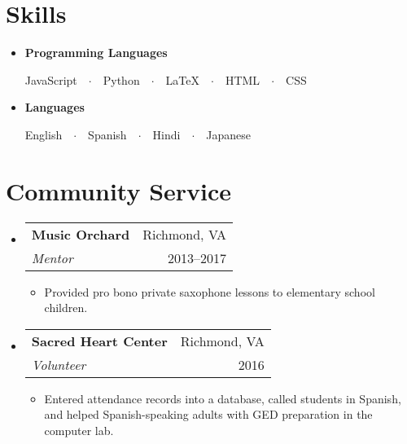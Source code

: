 \documentclass{article}
\makeatletter
\newcommand{\resumeSubHeadingListStart}{\begin{itemize}[leftmargin=*]}
\newcommand{\resumeSubHeadingListEnd}{\end{itemize}}
\newcommand{\workSubheading}[5]{
\item
\begin{tabular*}{\textwidth}{l@{\extracolsep{\fill}}r}
\textbf{\large#1} & {\small #2} \\
\textit{#3} & {#4}
\end{tabular*}
\vspace{-1em}
\begin{itemize}
\item #5
\end{itemize}
\vspace{0.25em}}
\newlength{\spacebox}
\newcommand{\skillEntry}[2]{
\item
\hspace{1em}\parbox{\spacebox}{
\raggedright{\textbf{#1}}}
\hspace{-2.5em} #2 \par}
\makeatother
\begin{document}

\vspace{-1em}
\section{Skills}

\resumeSubHeadingListStart
\skillEntry{Programming Languages}
{JavaScript\ \ $\cdotp$\ \ Python\ \ $\cdotp$\ \ \LaTeX\ \ $\cdotp$\ \ HTML\ \ $\cdotp$\ \ CSS}


\skillEntry{Languages}
{English\ \ $\cdotp$\ \ Spanish\ \ $\cdotp$\ \ Hindi\ \ $\cdotp$\ \ Japanese}
\resumeSubHeadingListEnd



\vspace{-1em}
\section{Community Service}

\resumeSubHeadingListStart
\workSubheading{Music Orchard}{Richmond, VA}
{Mentor}{2013--2017}
{Provided pro bono private saxophone lessons to elementary school children.}

\workSubheading{Sacred Heart Center}{Richmond, VA}
{Volunteer}{2016}
{Entered attendance records into a database, called students in Spanish, and helped Spanish-speaking adults with GED preparation in the computer lab.}
\resumeSubHeadingListEnd
\end{document}
